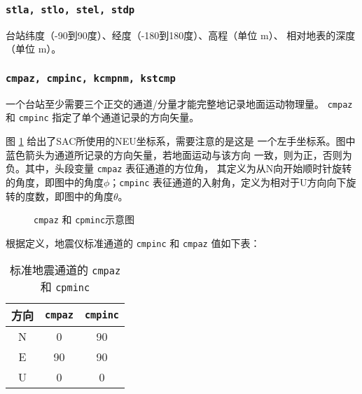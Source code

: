 \subsubsection{\texttt{stla, stlo, stel\dag, stdp\dag}}
台站纬度（-90到90度）、经度（-180到180度）、高程（单位 \si{m}）、
相对地表的深度（单位 \si{m}）。

\subsubsection{\texttt{cmpaz, cmpinc, kcmpnm, kstcmp}}
一个台站至少需要三个正交的通道/分量才能完整地记录地面运动物理量。
\texttt{cmpaz} 和 \texttt{cmpinc} 指定了单个通道记录的方向矢量。

图 \ref{fig:cmpaz-cmpinc} 给出了SAC所使用的NEU坐标系，需要注意的是这是
一个左手坐标系。图中蓝色箭头为通道所记录的方向矢量，若地面运动与该方向
一致，则为正，否则为负。其中，头段变量 \texttt{cmpaz} 表征通道的方位角，
其定义为从N向开始顺时针旋转的角度，即图中的角度$\phi$；\texttt{cmpinc}
表征通道的入射角，定义为相对于U方向向下旋转的度数，即图中的角度$\theta$。

\begin{figure}[H]
\centering
{}
\caption{\texttt{cmpaz} 和 \texttt{cpminc}示意图}
\label{fig:cmpaz-cmpinc}
\end{figure}

根据定义，地震仪标准通道的 \texttt{cmpinc} 和 \texttt{cmpaz} 值如下表：
\begin{table}[H]
\caption{标准地震通道的 \texttt{cmpaz} 和 \texttt{cpminc}}
\label{table:neu-cmpaz-cmpinc}
\centering
\begin{tabular}{ccc}
\toprule
方向    &   \texttt{cmpaz}   &   \texttt{cmpinc}  \\
\midrule
N       &   0       &   90          \\
E       &   90      &   90          \\
U       &   0       &   0           \\
\bottomrule
\end{tabular}
\end{table}

